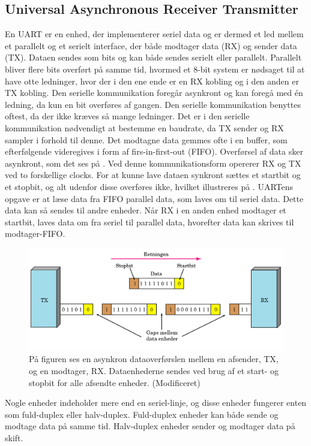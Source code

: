 \subsection{Universal Asynchronous Receiver Transmitter}
En UART er en enhed, der implementerer seriel data og er dermed et led mellem et parallelt og et serielt interface, der både modtager data (RX) og sender data (TX). Dataen sendes som bits og kan både sendes serielt eller parallelt. \citep{Jimb02016a,Chun-zhiYin-shuiLun-yao2011} Parallelt bliver flere bits overført på samme tid, hvormed et 8-bit system er nødsaget til at have otte ledninger, hvor der i den ene ende er en RX kobling og i den anden er TX kobling. \citep{Jimb02016a} Den serielle kommunikation foregår asynkront og kan foregå med én ledning, da kun en bit overføres af gangen. Den serielle kommunikation benyttes oftest, da der ikke kræves så mange ledninger. Det er i den serielle kommunikation nødvendigt at bestemme en baudrate, da TX sender og RX sampler i forhold til denne. Det modtagne data gemmes ofte i en buffer, som efterfølgende videregives i form af firs-in-first-out (FIFO). \citep{Jimb02016a}\newline 
Overførsel af data sker asynkront, som det ses på . Ved denne kommunikationsform opererer RX og TX ved to forskellige clocks. For at kunne lave dataen synkront sættes et startbit og et stopbit, og alt udenfor disse overføres ikke, hvilket illustreres på . UARTens opgave er at læse data fra FIFO parallel data, som laves om til seriel data. Dette data kan så sendes til andre enheder. Når RX i en anden enhed modtager et startbit, laves data om fra seriel til parallel data, hvorefter data kan skrives til modtager-FIFO. \citep{Jimb02016a,Chun-zhiYin-shuiLun-yao2011}
\begin{figure}[H]
	\centering
	\includegraphics[scale=0.6]{figures/bProblemloesning/asynkron.png}
	\caption{På figuren ses en asynkron dataoverførslen mellem en afsender, TX, og en modtager, RX. Dataenhederne sendes ved brug af et start- og stopbit for alle afsendte enheder. \citep{Jimb02016} (Modificeret)}
	\label{fig:asynkron}
\end{figure}
Nogle enheder indeholder mere end en seriel-linje, og disse enheder fungerer enten som fuld-duplex eller halv-duplex. Fuld-duplex enheder kan både sende og modtage data på samme tid. Halv-duplex enheder sender og modtager data på skift. \citep{Jimb02016a,Chun-zhiYin-shuiLun-yao2011}